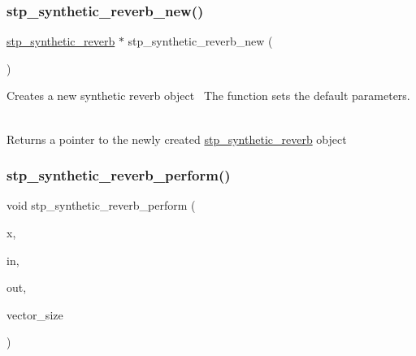 \subsubsection{\texorpdfstring{stp\+\_\+synthetic\+\_\+reverb\+\_\+new()}{stp\_synthetic\_reverb\_new()}}
{\footnotesize\ttfamily \hyperlink{structstp__synthetic__reverb}{stp\+\_\+synthetic\+\_\+reverb} $\ast$ stp\+\_\+synthetic\+\_\+reverb\+\_\+new (\begin{DoxyParamCaption}{ }\end{DoxyParamCaption})\hspace{0.3cm}{\ttfamily [related]}}



Creates a new synthetic reverb object~\newline
 The function sets the default parameters. ~\newline
 

\begin{DoxyReturn}{Returns}
a pointer to the newly created \hyperlink{structstp__synthetic__reverb}{stp\+\_\+synthetic\+\_\+reverb} object ~\newline
 
\end{DoxyReturn}
\mbox{\label{structstp__synthetic__reverb_af385f69d342da49868fe1c9b8bf0a11a}} 
\subsubsection{\texorpdfstring{stp\+\_\+synthetic\+\_\+reverb\+\_\+perform()}{stp\_synthetic\_reverb\_perform()}}
{\footnotesize\ttfamily void stp\+\_\+synthetic\+\_\+reverb\+\_\+perform (\begin{DoxyParamCaption}\item[{\hyperlink{structstp__synthetic__reverb}{stp\+\_\+synthetic\+\_\+reverb} $\ast$}]{x,  }\item[{\hyperlink{stp__defines_8h_a142134bffa517ce86ebf0bdcdbe975d2}{S\+T\+P\+\_\+\+I\+N\+P\+U\+T\+V\+E\+C\+T\+OR} $\ast$}]{in,  }\item[{S\+T\+P\+\_\+\+O\+U\+T\+P\+U\+T\+V\+E\+C\+T\+OR $\ast$}]{out,  }\item[{int}]{vector\+\_\+size }\end{DoxyParamCaption})\hspace{0.3cm}{\ttfamily [related]}}



